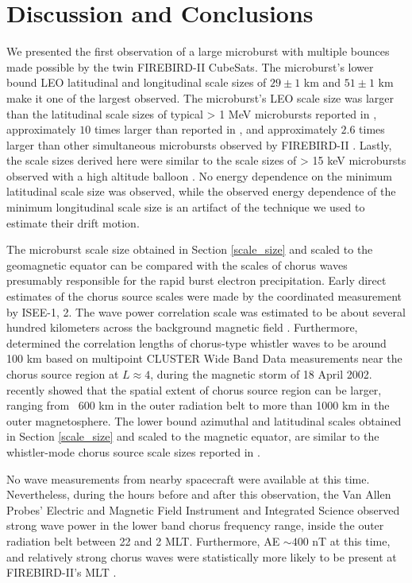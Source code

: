 \section{Discussion and Conclusions} \label{discussion}
We presented the first observation of a large microburst with multiple bounces made possible by the twin FIREBIRD-II CubeSats. The microburst's lower bound LEO latitudinal and longitudinal scale sizes of $29 \pm 1$ km and $ 51 \pm 1$ km make it one of the largest observed. The microburst's LEO scale size was larger than the latitudinal scale sizes of typical > 1 MeV microbursts reported in \citet{Blake1996}, approximately $10$ times larger than reported in \citet{Dietrich2010}, and approximately $2.6$ times larger than other simultaneous microbursts observed by FIREBIRD-II \citep{Crew2016}. Lastly, the scale sizes derived here were similar to the scale sizes of > 15 keV microbursts observed with a high altitude balloon \citep{Parks1967}. No energy dependence on the minimum latitudinal scale size was observed, while the observed energy dependence of the minimum longitudinal scale size is an artifact of the technique we used to estimate their drift motion.

The microburst scale size obtained in Section \ref{scale_size} and scaled to the geomagnetic equator can be compared with the scales of chorus waves presumably responsible for the rapid burst electron precipitation. Early direct estimates of the chorus source scales were made by the coordinated measurement by ISEE-1, 2. The wave power correlation scale was estimated to be about several hundred kilometers across the background magnetic field \citep{Gurnett1979}. Furthermore, \citet{Santolik2003} determined the correlation lengths of chorus-type whistler waves to be around 100 km based on multipoint CLUSTER Wide Band Data measurements near the chorus source region at $L \approx 4$, during the magnetic storm of 18 April 2002. \citet{Agapitov2010, Agapitov2011b, Agapitov2017a} recently showed that the spatial extent of chorus source region can be larger, ranging from ~600 km in the outer radiation belt to more than 1000 km in the outer magnetosphere. The lower bound azimuthal and latitudinal scales obtained in Section \ref{scale_size} and scaled to the magnetic equator, are similar to the whistler-mode chorus source scale sizes reported in \citet{Agapitov2011b, Agapitov2017a}. 

No wave measurements from nearby spacecraft were available at this time. Nevertheless, during the hours before and after this observation, the Van Allen Probes' \citep{Mauk2013} Electric and Magnetic Field Instrument and Integrated Science \citep{Kletzing2013} observed strong wave power in the lower band chorus frequency range, inside the outer radiation belt between 22 and 2 MLT. Furthermore, AE $\sim 400$ nT at this time, and relatively strong chorus waves were statistically more likely to be present at FIREBIRD-II's MLT \citep{Li2009}.

